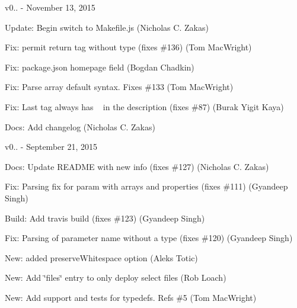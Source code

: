 v0.. -\/ November 13, 2015


\begin{DoxyItemize}
\item Update\+: Begin switch to Makefile.\+js (Nicholas C. Zakas)
\item Fix\+: permit return tag without type (fixes \#136) (Tom Mac\+Wright)
\item Fix\+: package.\+json homepage field (Bogdan Chadkin)
\item Fix\+: Parse array default syntax. Fixes \#133 (Tom Mac\+Wright)
\item Fix\+: Last tag always has ~\newline
 in the description (fixes \#87) (Burak Yigit Kaya)
\item Docs\+: Add changelog (Nicholas C. Zakas)
\end{DoxyItemize}

v0.. -\/ September 21, 2015


\begin{DoxyItemize}
\item Docs\+: Update README with new info (fixes \#127) (Nicholas C. Zakas)
\item Fix\+: Parsing fix for param with arrays and properties (fixes \#111) (Gyandeep Singh)
\item Build\+: Add travis build (fixes \#123) (Gyandeep Singh)
\item Fix\+: Parsing of parameter name without a type (fixes \#120) (Gyandeep Singh)
\item New\+: added preserve\+Whitespace option (Aleks Totic)
\item New\+: Add \char`\"{}files\char`\"{} entry to only deploy select files (Rob Loach)
\item New\+: Add support and tests for typedefs. Refs \#5 (Tom Mac\+Wright) 
\end{DoxyItemize}